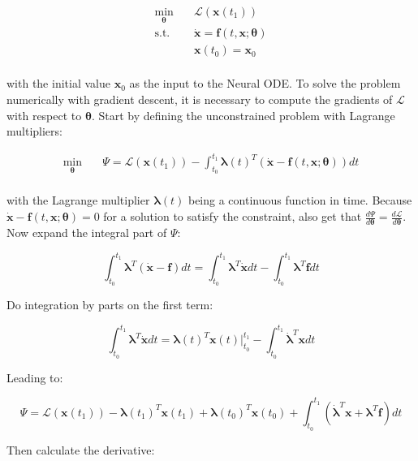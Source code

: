 \begin{equation}
    \begin{aligned}
        \min_{\bm{\theta}} \quad & \mathcal{L}(\bm{x}(t_1)) \\
        \textrm{s.t.} \quad & \dot{\bm{x}} = \bm{f}(t, \bm{x}; \bm{\theta}) \\
        & \bm{x}(t_0) = \bm{x}_0 \\
    \end{aligned}
\end{equation}

\noindent with the initial value $\bm{x}_0$ as the input to the Neural ODE. To solve the problem numerically with gradient descent, it is necessary to compute the gradients of $\mathcal{L}$ with respect to $\bm{\theta}$. Start by defining the unconstrained problem with Lagrange multipliers:

\begin{equation}
    \begin{aligned}
        \min_{\bm{\theta}} \quad & \Psi = \mathcal{L}(\bm{x}(t_1)) - \int_{t_0}^{t_1} \bm{\lambda}(t)^T (\dot{\bm{x}} - \bm{f}(t, \bm{x}; \bm{\theta})) dt\\
    \end{aligned}
    \label{eq:unconstrainednodeadjoint}
\end{equation}

\noindent with the Lagrange multiplier $\bm{\lambda}(t)$ being a continuous function in time. Because $\dot{\bm{x}} - \bm{f}(t, \bm{x}; \bm{\theta}) = 0$ for a solution to satisfy the constraint, also get that $\frac{d \Psi}{d \bm{\theta}} = \frac{d \mathcal{L}}{d \bm{\theta}}$. Now expand the integral part of $\Psi$:

$$
\int_{t_0}^{t_1} \bm{\lambda}^T (\dot{\bm{x}} - \bm{f}) dt = \int_{t_0}^{t_1} \bm{\lambda}^T \dot{\bm{x}} dt - \int_{t_0}^{t_1} \bm{\lambda}^T \bm{f} dt
$$

Do integration by parts on the first term:

$$
\int_{t_0}^{t_1} \bm{\lambda}^T \dot{\bm{x}} dt = \bm{\lambda}(t)^T \bm{x}(t) \big \rvert_{t_0}^{t_1} - \int_{t_0}^{t_1} \dot{\bm{\lambda}}^T \bm{x} dt
$$

Leading to:

$$
\Psi = \mathcal{L}(\bm{x}(t_1)) - \bm{\lambda}(t_1)^T \bm{x}(t_1) + \bm{\lambda}(t_0)^T \bm{x}(t_0) + \int_{t_0}^{t_1} (\dot{\bm{\lambda}}^T \bm{x} + \bm{\lambda}^T \bm{f}) dt
$$

Then calculate the derivative:

